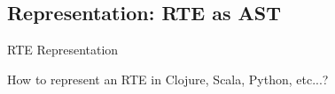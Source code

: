 \subsection{Representation: RTE as AST}


{  %
\begin{frame}{ RTE Representation}

  How to represent an RTE in Clojure, Scala, Python, etc...?


  \medskip
  
\end{frame}
}

\newsavebox\exnoteboxscala
\begin{lrbox}{\exnoteboxscala}
  \begin{minipage}{6.5cm}
    
  \end{minipage}
\end{lrbox}

\newsavebox\exnoteboxclojure
\begin{lrbox}{\exnoteboxclojure}
  \begin{minipage}{6.5cm}
    
  \end{minipage}
\end{lrbox}

\newsavebox\exnoteboxpython
\begin{lrbox}{\exnoteboxpython}
  \begin{minipage}{6.5cm}
    
  \end{minipage}
\end{lrbox}


